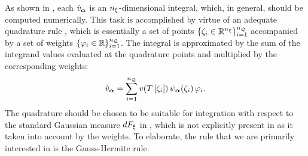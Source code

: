 As shown in , each $\hat{v}_{{\boldsymbol \alpha}}$ is an ${n_\xi}$-dimensional integral, which, in general, should be computed numerically.
This task is accomplished by virtue of an adequate quadrature rule \cite{press2007}, which is essentially a set of points $\{ \zeta_i \in \mathbb{R}^{n_\xi} \}_{i = 1}^{n_\mathcal{Q}}$ accompanied by a set of weights $\{ \varphi_i \in \mathbb{R} \}_{i = 1}^{n_\mathcal{Q}}$.
The integral is approximated by the sum of the integrand values evaluated at the quadrature points and multiplied by the corresponding weights:
\begin{equation} \xelab{non-intrusive-orthogonal-projection}
  \coefficient{\w}_{\multiindex} = \sum_{i = 1}^\nqorder \w(\transformation{\point_i}) \, \polynomial_{\multiindex}(\point_i) \, \weight_i.
\end{equation}
The quadrature should be chosen to be suitable for integration with respect to the standard Gaussian measure $dF_\xi$ in , which is not explicitly present in  as it taken into account by the weights.
To elaborate, the rule that we are primarily interested in is the Gauss-Hermite rule.
